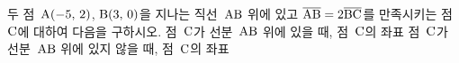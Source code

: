 두 점~$\mathrm{A}(-5,\,2)$, $\mathrm{B}(3,\,0)$을 지나는 직선~$\mathrm{AB}$ 위에 있고 $\overline{\mathrm{AB}}=2\overline{\mathrm{BC}}$를 만족시키는 점~$\mathrm{C}$에 대하여 다음을 구하시오.
 점~$\mathrm{C}$가 선분~$\mathrm{AB}$ 위에 있을 때, 점~$\mathrm{C}$의 좌표
 점~$\mathrm{C}$가 선분~$\mathrm{AB}$ 위에 있지 않을 때, 점~$\mathrm{C}$의 좌표
